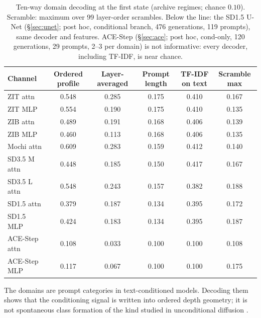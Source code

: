 \documentclass[11pt]{article}
\begin{document}
\begin{table}[h]
\centering\small
\caption{Ten-way domain decoding at the first state (archive regimes; chance $0.10$). Scramble: maximum over 99 layer-order scrambles. Below the line: the SD1.5 U-Net (\S\ref{sec:unet}; post hoc, conditional branch, 476 generations, 119 prompts), same decoder and features. ACE-Step (\S\ref{sec:ace}; post hoc, cond-only, 120 generations, 29 prompts, 2--3 per domain) is not informative: every decoder, including TF-IDF, is near chance.}
\label{tab:decode}
\begin{tabular}{lccccc}
\toprule
Channel & Ordered profile & Layer-averaged & Prompt length & TF-IDF on text & Scramble max\\
\midrule
ZIT attn & 0.548 & 0.285 & 0.175 & 0.410 & 0.167\\
ZIT MLP & 0.554 & 0.190 & 0.175 & 0.410 & 0.135\\
ZIB attn & 0.489 & 0.191 & 0.168 & 0.406 & 0.139\\
ZIB MLP & 0.460 & 0.113 & 0.168 & 0.406 & 0.135\\
Mochi attn & 0.609 & 0.283 & 0.159 & 0.412 & 0.140\\
SD3.5 M attn & 0.448 & 0.185 & 0.150 & 0.417 & 0.167\\
SD3.5 L attn & 0.548 & 0.243 & 0.157 & 0.382 & 0.188\\
\midrule
SD1.5 attn & 0.379 & 0.187 & 0.134 & 0.395 & 0.172\\
SD1.5 MLP & 0.424 & 0.183 & 0.134 & 0.395 & 0.187\\
ACE-Step attn & 0.108 & 0.033 & 0.100 & 0.100 & 0.108\\
ACE-Step MLP & 0.117 & 0.067 & 0.100 & 0.100 & 0.175\\
\bottomrule
\end{tabular}
\end{table}

The domains are prompt categories in text-conditioned models. Decoding them shows that the conditioning signal is written into ordered depth geometry; it is not spontaneous class formation of the kind studied in unconditional diffusion \citep{biroli2024dynamical,sclocchi2025phase}.
\end{document}
